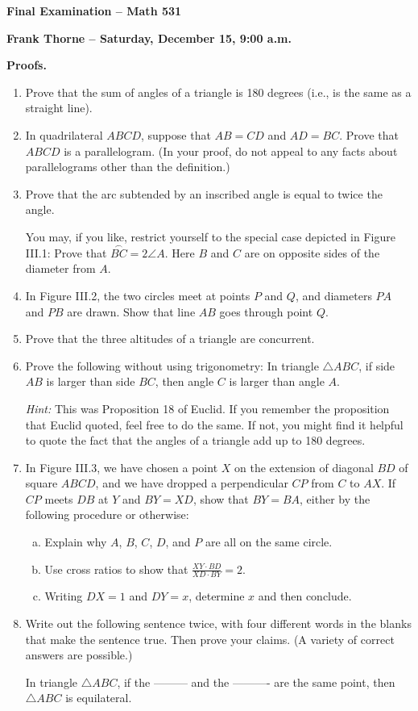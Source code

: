 \documentclass[12pt]{article}
\begin{document}
\setlength{\topmargin}{-2mm}





\begin{center}{\bf Final Examination -- Math 531}
\end{center}
\begin{center}
{\bf Frank Thorne -- Saturday, December 15, 9:00 a.m.}
\end{center}

{\bf Proofs.}
\begin{enumerate}[(1)]
\item
Prove that the sum of angles of a triangle is 180 degrees (i.e., is the same as a straight line).
\item
In quadrilateral $ABCD$, suppose that $AB = CD$ and $AD = BC$. Prove that $ABCD$ is a parallelogram.
(In your proof, do not appeal to any facts about parallelograms other than the definition.)
\item
Prove that the arc subtended by an inscribed angle is equal to twice the angle.

You may, if you like,
restrict yourself to the special case depicted in Figure III.1: Prove that $\stackrel\frown{BC} = 2 \angle A$. Here $B$ and $C$ are on opposite sides of the diameter from $A$.
\item
In Figure III.2, the two circles meet at points $P$ and $Q$, and diameters $PA$ and $PB$ are drawn.
Show that line $AB$ goes through point $Q$.
\item
Prove that the three altitudes of a triangle are concurrent.
\item
Prove the following without using trigonometry: In triangle $\triangle ABC$, if side $AB$ is larger than
side $BC$, then angle $C$ is larger than angle $A$.

{\itshape Hint:} This was Proposition 18 of Euclid. If you remember the proposition that Euclid quoted,
feel free to do the same. If not, you might find it helpful to quote the fact that the angles of a triangle
add up to 180 degrees.
\item
In Figure III.3, we have chosen a point $X$ on the extension of diagonal $BD$ of square $ABCD$,
and we have dropped a perpendicular $CP$ from $C$ to $AX$. If $CP$ meets $DB$ at $Y$ and
$BY = XD$, show that $BY = BA$, either by the following procedure or otherwise:
\begin{enumerate}[(a)]
\item
Explain why $A$, $B$, $C$, $D$, and $P$ are all on the same circle.
\item
Use cross ratios to show that $\frac{XY \cdot BD}{XD \cdot BY} = 2$.
\item
Writing $DX = 1$ and $DY = x$, determine $x$ and then conclude.
\end{enumerate}
\item
Write out the following sentence twice, with four different words in the blanks that make
the sentence true. Then prove your claims. (A variety of correct answers are possible.)

\begin{center}
In triangle $\triangle ABC$, if the --------- and the ---------- are the same point, 
then $\triangle ABC$ is equilateral.
\end{center}

\end{enumerate}
\end{document}
